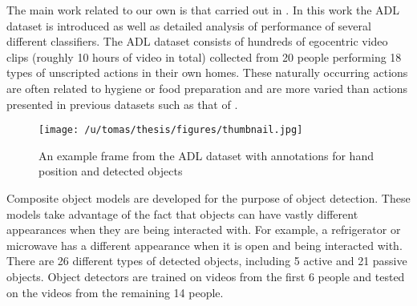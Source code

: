 \documentclass{bmvc2k}
\begin{document}
	The main work related to our own is that carried out in \cite{Ramanan12}. 
	In this work the ADL dataset is introduced as well as detailed analysis of
	performance of several different classifiers. 
  The ADL dataset consists of hundreds of egocentric video clips
	(roughly 10 hours of video in total) collected from 20 people performing
	18 types of unscripted actions in their own homes. These naturally
  occurring
  actions are often related to hygiene or food preparation and are more
  varied than actions presented in previous datasets such as that of \cite{Fathi11}.
	\begin{figure}[t]
		\begin{center}
			  \texttt{[image: /u/tomas/thesis/figures/thumbnail.jpg]}
		\end{center}
    \caption{An example frame from the ADL dataset with annotations for hand
    position and detected objects} 
				\label{fig:long}
				\label{fig:onecol}
	\end{figure}
  Composite object models are developed for the purpose of object detection. 
  These models take advantage of the fact that objects can have vastly
  different appearances when they are being interacted with. For example, a
  refrigerator or microwave has a different appearance when it is open and
  being interacted with. 
  There are 26 different 
	types of detected objects, including 5 active and 21 passive objects. 
  Object detectors are trained on videos from the
  first 6 people and tested on the videos from the remaining 14 people.
  
\end{document}
